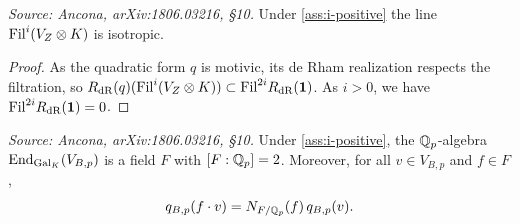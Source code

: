 \begin{lemma}
  \label{lem:isotropic-line}
  \textit{Source: Ancona, arXiv:1806.03216, \S10.}
  Under \cref{ass:i-positive} the line \(\mathrm{Fil}^i(V_Z \otimes K)\) is isotropic.
\end{lemma}

\begin{proof}
  As the quadratic form \(q\) is motivic, its de Rham realization respects the
  filtration, so \(R_{\mathrm{dR}}(q)(\mathrm{Fil}^i(V_Z \otimes K)) \subset \mathrm{Fil}^{2i} R_{\mathrm{dR}}(\mathbf{1})\).
  As \(i > 0\), we have \(\mathrm{Fil}^{2i} R_{\mathrm{dR}}(\mathbf{1}) = 0\).
\end{proof}

\begin{proposition}
  \label{prop:endo-field}
  \textit{Source: Ancona, arXiv:1806.03216, \S10.}
  Under \cref{ass:i-positive}, the \(\mathbb{Q}_p\)-algebra
  \(\mathrm{End}_{\mathrm{Gal}_K}(V_{B,p})\) is a field \(F\) with \([F : \mathbb{Q}_p] = 2\). Moreover,
  for all \(v \in V_{B,p}\) and \(f \in F\),
  \begin{equation}
    q_{B,p}(f \cdot v) = N_{F/\mathbb{Q}_p}(f)\, q_{B,p}(v).
  \end{equation}
\end{proposition}

